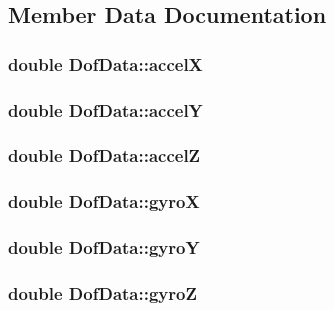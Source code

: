 \subsection{Member Data Documentation}
\hypertarget{struct_dof_data_a428cfa39fa295506315a15dd7aec6af9}{
\subsubsection[{accel\-X}]{\setlength{\rightskip}{0pt plus 5cm}double Dof\-Data\-::accel\-X}}\label{struct_dof_data_a428cfa39fa295506315a15dd7aec6af9}
\hypertarget{struct_dof_data_aff5dae3fd5404b3655b2848b720e6d4e}{
\subsubsection[{accel\-Y}]{\setlength{\rightskip}{0pt plus 5cm}double Dof\-Data\-::accel\-Y}}\label{struct_dof_data_aff5dae3fd5404b3655b2848b720e6d4e}
\hypertarget{struct_dof_data_a2be73a3c7df7e25639b04d8807cb738f}{
\subsubsection[{accel\-Z}]{\setlength{\rightskip}{0pt plus 5cm}double Dof\-Data\-::accel\-Z}}\label{struct_dof_data_a2be73a3c7df7e25639b04d8807cb738f}
\hypertarget{struct_dof_data_a9edd0b04a8b14a336b8c02ca464bc9d8}{
\subsubsection[{gyro\-X}]{\setlength{\rightskip}{0pt plus 5cm}double Dof\-Data\-::gyro\-X}}\label{struct_dof_data_a9edd0b04a8b14a336b8c02ca464bc9d8}
\hypertarget{struct_dof_data_a6303a0c2d3c7990323908b437f1c8205}{
\subsubsection[{gyro\-Y}]{\setlength{\rightskip}{0pt plus 5cm}double Dof\-Data\-::gyro\-Y}}\label{struct_dof_data_a6303a0c2d3c7990323908b437f1c8205}
\hypertarget{struct_dof_data_ac1d0c1061bbf2b5e70976227e713cddf}{
\subsubsection[{gyro\-Z}]{\setlength{\rightskip}{0pt plus 5cm}double Dof\-Data\-::gyro\-Z}}\label{struct_dof_data_ac1d0c1061bbf2b5e70976227e713cddf}
